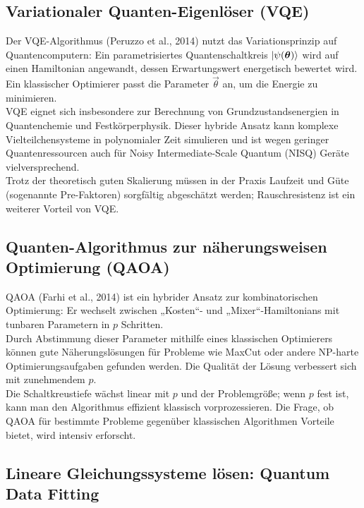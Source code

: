 \subsection{Variationaler Quanten-Eigenlöser (VQE)}

Der VQE-Algorithmus (Peruzzo et al., 2014) nutzt das Variationsprinzip auf Quantencomputern: Ein parametrisiertes Quantenschaltkreis $\ket{\psi(\vec\theta)}$ wird auf einen Hamiltonian angewandt, dessen Erwartungswert energetisch bewertet wird. Ein klassischer Optimierer passt die Parameter $\vec\theta$ an, um die Energie zu minimieren.\\
VQE eignet sich insbesondere zur Berechnung von Grundzustandsenergien in Quantenchemie und Festkörperphysik. Dieser hybride Ansatz kann komplexe Vielteilchensysteme in polynomialer Zeit simulieren und ist wegen geringer Quantenressourcen auch für Noisy Intermediate-Scale Quantum (NISQ) Geräte vielversprechend.\\
Trotz der theoretisch guten Skalierung müssen in der Praxis Laufzeit und Güte (sogenannte Pre-Faktoren) sorgfältig abgeschätzt werden; Rauschresistenz ist ein weiterer Vorteil von VQE.

\subsection{Quanten-Algorithmus zur näherungsweisen Optimierung (QAOA)}

QAOA (Farhi et al., 2014) ist ein hybrider Ansatz zur kombinatorischen Optimierung: Er wechselt zwischen „Kosten“- und „Mixer“-Hamiltonians mit tunbaren Parametern in $p$ Schritten.\\
Durch Abstimmung dieser Parameter mithilfe eines klassischen Optimierers können gute Näherungslösungen für Probleme wie MaxCut oder andere NP-harte Optimierungsaufgaben gefunden werden. Die Qualität der Lösung verbessert sich mit zunehmendem $p$.\\
Die Schaltkreustiefe wächst linear mit $p$ und der Problemgröße; wenn $p$ fest ist, kann man den Algorithmus effizient klassisch vorprozessieren. Die Frage, ob QAOA für bestimmte Probleme gegenüber klassischen Algorithmen Vorteile bietet, wird intensiv erforscht.\\

\subsection{Lineare Gleichungssysteme lösen: Quantum Data Fitting}

